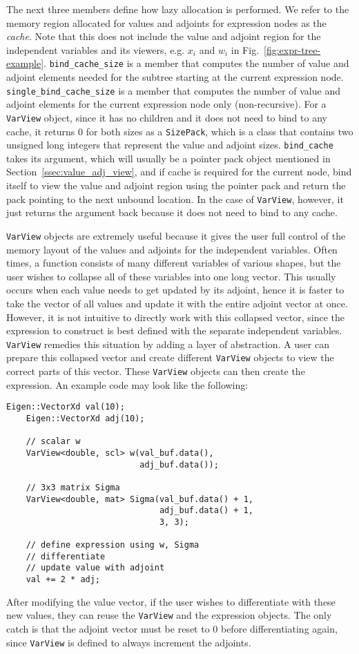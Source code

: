 The next three members define how lazy allocation is performed.
We refer to the memory region allocated for values and adjoints for
expression nodes as the \emph{cache}.
Note that this does not include the value and adjoint region 
for the independent variables and its viewers,
e.g. $x_i$ and $w_i$ in Fig.~\ref{fig:expr-tree-example}.
\verb|bind_cache_size| is a member that computes the number of value and adjoint elements
needed for the subtree starting at the current expression node.
\verb|single_bind_cache_size| is a member that computes the number of value and adjoint elements
for the current expression node only (non-recursive).
For a \verb|VarView| object,
since it has no children and it does not need to bind to any cache,
it returns $ 0$ for both sizes as a \verb|SizePack|,
which is a class that contains two unsigned long integers
that represent the value and adjoint sizes.
\verb|bind_cache| takes its argument,
which will usually be a pointer pack object mentioned in Section~\ref{ssec:value_adj_view},
and if cache is required for the current node,
bind itself to view the value and adjoint region using the pointer pack
and return the pack pointing to the next unbound location.
In the case of \verb|VarView|, however, it just returns the argument back
because it does not need to bind to any cache.

\verb|VarView| objects are extremely useful because it gives the user full control 
of the memory layout of the values and adjoints for the independent variables.
Often times, a function consists of many different variables of various shapes,
but the user wishes to collapse all of these variables into one long vector.
This usually occurs when each value needs to get updated by its adjoint,
hence it is faster to take the vector of all values and update it with the entire adjoint vector at once.
However, it is not intuitive to directly work with this collapsed vector,
since the expression to construct is best defined with the separate independent variables.
\verb|VarView| remedies this situation by adding a layer of abstraction.
A user can prepare this collapsed vector and create different \verb|VarView|
objects to view the correct parts of this vector.
These \verb|VarView| objects can then create the expression.
An example code may look like the following:
\begin{lstlisting}[style=customcpp]
    Eigen::VectorXd val(10);
    Eigen::VectorXd adj(10);

    // scalar w
    VarView<double, scl> w(val_buf.data(), 
                           adj_buf.data());

    // 3x3 matrix Sigma
    VarView<double, mat> Sigma(val_buf.data() + 1,
                               adj_buf.data() + 1,
                               3, 3);

    // define expression using w, Sigma
    // differentiate
    // update value with adjoint
    val += 2 * adj;
\end{lstlisting}

After modifying the value vector, if the user wishes to differentiate with these new values,
they can reuse the \verb|VarView| and the expression objects.
The only catch is that the adjoint vector must be reset to 0 before differentiating again,
since \verb|VarView| is defined to always increment the adjoints.

